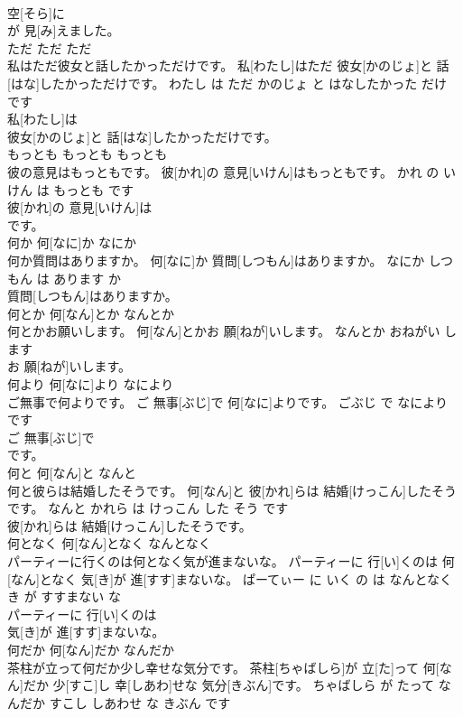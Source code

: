 \documentclass[8pt]{extreport}
\begin{document}
\begin{CJK}{UTF8}{min}
\\	空[そら]に
\\	が 見[み]えました。			
\\	ただ	ただ	ただ	
\\	私はただ彼女と話したかっただけです。	私[わたし]はただ 彼女[かのじょ]と 話[はな]したかっただけです。	わたし は ただ かのじょ と はなしたかった だけ です	
\\	私[わたし]は
\\	彼女[かのじょ]と 話[はな]したかっただけです。			
\\	もっとも	もっとも	もっとも	
\\	彼の意見はもっともです。	彼[かれ]の 意見[いけん]はもっともです。	かれ の いけん は もっとも です	
\\	彼[かれ]の 意見[いけん]は
\\	です。			
\\	何か	何[なに]か	なにか	
\\	何か質問はありますか。	何[なに]か 質問[しつもん]はありますか。	なにか しつもん は あります か	
\\	質問[しつもん]はありますか。			
\\	何とか	何[なん]とか	なんとか	
\\	何とかお願いします。	何[なん]とかお 願[ねが]いします。	なんとか おねがい します	
\\	お 願[ねが]いします。			
\\	何より	何[なに]より	なにより	
\\	ご無事で何よりです。	ご 無事[ぶじ]で 何[なに]よりです。	ごぶじ で なにより です	
\\	ご 無事[ぶじ]で
\\	です。			
\\	何と	何[なん]と	なんと	
\\	何と彼らは結婚したそうです。	何[なん]と 彼[かれ]らは 結婚[けっこん]したそうです。	なんと かれら は けっこん した そう です	
\\	彼[かれ]らは 結婚[けっこん]したそうです。			
\\	何となく	何[なん]となく	なんとなく	
\\	パーティーに行くのは何となく気が進まないな。	パーティーに 行[い]くのは 何[なん]となく 気[き]が 進[すす]まないな。	ぱーてぃー に いく の は なんとなく き が すすまない な	
\\	パーティーに 行[い]くのは
\\	気[き]が 進[すす]まないな。			
\\	何だか	何[なん]だか	なんだか	
\\	茶柱が立って何だか少し幸せな気分です。	茶柱[ちゃばしら]が 立[た]って 何[なん]だか 少[すこ]し 幸[しあわ]せな 気分[きぶん]です。	ちゃばしら が たって なんだか すこし しあわせ な きぶん です	

\end{CJK}
\end{document}
